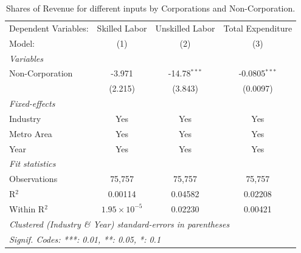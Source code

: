 \documentclass[
  12pt]{article}
\begin{document}
\begin{table}

\caption{\label{tbl-reg-shares-2}Shares of Revenue for different inputs
by Corporations and Non-Corporation.}

\begin{minipage}{\linewidth}

\begingroup
\centering
\begin{tabular}{lccc}
   \tabularnewline \midrule \midrule
   Dependent Variables: & Skilled Labor         & Unskilled Labor & Total Expenditure\\  
   Model:               & (1)                   & (2)             & (3)\\  
   \midrule
   \emph{Variables}\\
   Non-Corporation      & -3.971                & -14.78$^{***}$  & -0.0805$^{***}$\\   
                        & (2.215)               & (3.843)         & (0.0097)\\   
   \midrule
   \emph{Fixed-effects}\\
   Industry             & Yes                   & Yes             & Yes\\  
   Metro Area           & Yes                   & Yes             & Yes\\  
   Year                 & Yes                   & Yes             & Yes\\  
   \midrule
   \emph{Fit statistics}\\
   Observations         & 75,757                & 75,757          & 75,757\\  
   R$^2$                & 0.00114               & 0.04582         & 0.02208\\  
   Within R$^2$         & $1.95\times 10^{-5}$  & 0.02230         & 0.00421\\  
   \midrule \midrule
   \multicolumn{4}{l}{\emph{Clustered (Industry \& Year) standard-errors in parentheses}}\\
   \multicolumn{4}{l}{\emph{Signif. Codes: ***: 0.01, **: 0.05, *: 0.1}}\\
\end{tabular}
\par\endgroup

\end{minipage}%

\end{table}%
\end{document}
